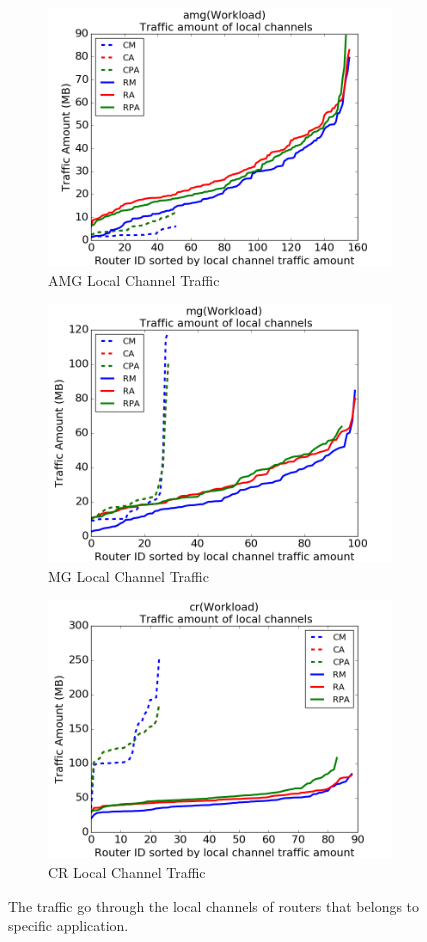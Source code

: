 \documentclass[conference,compsoc]{IEEEtran}
\begin{document}
\begin{figure}[t!]
    \centering
    \begin{subfigure}[t]{0.32\textwidth}
        \centering
        \includegraphics[height=1.8 in]{amg/lc-traffic}
        \caption{AMG Local Channel Traffic}
        \label{fig:amg-lc-traffic}
    \end{subfigure}%
    \hspace{1em}%
    \begin{subfigure}[t]{0.32\textwidth}
        \centering
        \includegraphics[height=1.8 in]{mg/lc-traffic}
        \caption{MG Local Channel Traffic}
        \label{fig:mg-lc-traffic}
    \end{subfigure}%
    \begin{subfigure}[t]{0.32\textwidth}
        \centering
        \includegraphics[height=1.8 in]{cr/lc-traffic}
        \caption{CR Local Channel Traffic}
        \label{fig:cr-lc-traffic}
    \end{subfigure}%
   \caption{The traffic go through the local channels of routers that belongs to specific application.  }
   \label{fig:3app-lc-traffic}
\end{figure}
\end{document}
